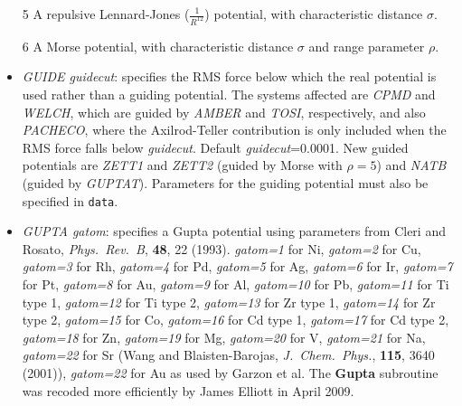 \documentclass[12pt,a4paper,dvips]{article}
\begin{document}
\begin{itemize}
5 A repulsive Lennard-Jones ($\frac{\displaystyle 1}{\displaystyle R^{12}}$) potential, 
with characteristic distance {\it $\sigma$}.

6 A Morse potential, with characteristic distance {\it $\sigma$} and range parameter {\it $\rho$}.

\item {\it GUIDE\/ guidecut}: specifies the RMS force below which the real potential is used
rather than a guiding potential. The systems affected are {\it CPMD\/} and {\it WELCH},
which are guided by {\it AMBER\/} and {\it TOSI\/}, respectively, and also {\it PACHECO\/},
where the Axilrod-Teller contribution is only included when the RMS force falls below
{\it guidecut\/}. Default {\it guidecut\/}=0.0001.
New guided potentials are {\it ZETT1} and {\it ZETT2} (guided by Morse with $\rho=5$) and
{\it NATB} (guided by {\it GUPTAT}). Parameters for the guiding potential must also be specified in
{\tt data}.

\item{\it GUPTA gatom}: specifies a Gupta potential using parameters from Cleri and Rosato,
{\it Phys.~Rev.~B}, {\bf 48}, 22 (1993). {\it gatom=1} for Ni, 
{\it gatom=2} for Cu,
{\it gatom=3} for Rh,
{\it gatom=4} for Pd,
{\it gatom=5} for Ag,
{\it gatom=6} for Ir,
{\it gatom=7} for Pt,
{\it gatom=8} for Au,
{\it gatom=9} for Al,
{\it gatom=10} for Pb,
{\it gatom=11} for Ti type 1,
{\it gatom=12} for Ti type 2,
{\it gatom=13} for Zr type 1,
{\it gatom=14} for Zr type 2,
{\it gatom=15} for Co,
{\it gatom=16} for Cd type 1,
{\it gatom=17} for Cd type 2,
{\it gatom=18} for Zn,
{\it gatom=19} for Mg,
{\it gatom=20} for V,
{\it gatom=21} for Na,
{\it gatom=22} for Sr (Wang  and Blaisten-Barojas, {\it J.~Chem.~Phys.}, {\bf 115}, 3640 (2001)),
{\it gatom=22} for Au as used by Garzon et al.
The {\bf Gupta} subroutine was recoded more efficiently by James Elliott in April 2009.



\end{itemize}
\end{document}
